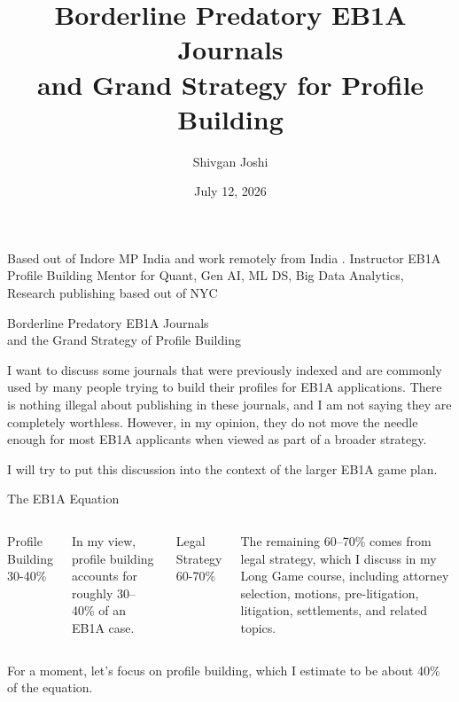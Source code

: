 \documentclass{beamer}
\title{Borderline Predatory EB1A Journals\\and Grand Strategy for Profile Building}
\author{Shivgan Joshi}
\institute{EB1A Profile Building Mentor\\Quant, Gen AI, ML DS, Big Data Analytics}
\date{July 12, 2026}
\begin{document}
	
	\begin{frame}
		\titlepage
		\centering
		Based out of Indore MP India and work remotely from India . Instructor EB1A Profile Building Mentor for Quant, Gen AI, ML DS, Big Data Analytics, Research publishing based out of NYC
	\end{frame}
	
	\begin{frame}{Borderline Predatory EB1A Journals\\and the Grand Strategy of Profile Building}
		\begin{block}{}
			I want to discuss some journals that were previously indexed and are commonly used by many people trying to build their profiles for EB1A applications. There is nothing illegal about publishing in these journals, and I am not saying they are completely worthless. However, in my opinion, they do not move the needle enough for most EB1A applicants when viewed as part of a broader strategy.
		\end{block}
		\vspace{0.3cm}
		I will try to put this discussion into the context of the larger EB1A game plan.
	\end{frame}
	
	\begin{frame}{The EB1A Equation}
		\begin{columns}
			\column{0.5\textwidth}
			\begin{block}{Profile Building}
				\Huge 30-40\%
			\end{block}
			In my view, profile building accounts for roughly 30–40\% of an EB1A case.
			\column{0.5\textwidth}
			\begin{block}{Legal Strategy}
				\Huge 60-70\%
			\end{block}
			The remaining 60–70\% comes from legal strategy, which I discuss in my Long Game course, including attorney selection, motions, pre-litigation, litigation, settlements, and related topics.
		\end{columns}
		\vspace{0.5cm}
		For a moment, let's focus on profile building, which I estimate to be about 40\% of the equation.
	\end{frame}
	
\end{document}
